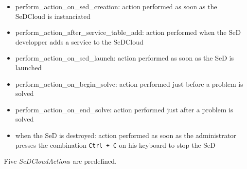 \begin{itemize}
  \item perform\_action\_on\_sed\_creation: action performed as soon as the SeDCloud is instanciated
  \item perform\_action\_after\_service\_table\_add: action performed when the SeD developper adds a service to the SeDCloud
  \item perform\_action\_on\_sed\_launch: action performed as soon as the SeD is launched
  \item perform\_action\_on\_begin\_solve: action performed just before a problem is solved
  \item perform\_action\_on\_end\_solve: action performed just after a problem is solved
  \item when the SeD is destroyed: action performed as soon as the
    administrator presses the combination \texttt{Ctrl + C} on his keyboard to stop the SeD
\end{itemize}
Five \emph{SeDCloudAction}s are predefined.


